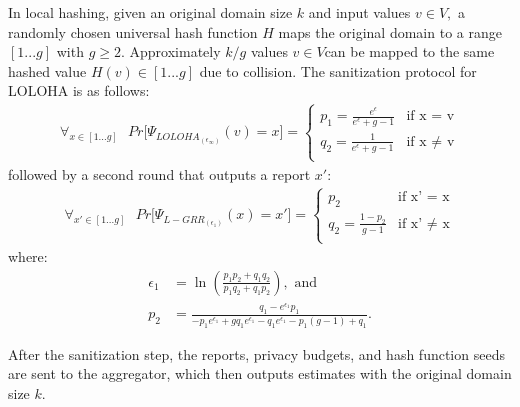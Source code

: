 In local hashing, given an original domain size $k$ and input values $v \in V,$ a randomly chosen universal hash function $H$ maps the original domain to a range $[1...g]$ with $g \geq 2$. Approximately $k/g$ values $v \in V $can be mapped to the same hashed value $H(v) \in [1...g]$ due to collision. The sanitization protocol for LOLOHA is as follows:
% 
\begin{align*}
\forall_{x \in [1...g]}\text{ }Pr\bigr[\Psi_{LOLOHA_{(\epsilon_\infty)}}(v) = x\bigr] =
\begin{cases}
      p_1 = \frac{e^\epsilon}{e^\epsilon + g - 1}  & \text{if x = v} \\
      q_2 = \frac{1}{e^\epsilon + g - 1} & \text{if x $\neq$ v} \\
\end{cases} 
\end{align*}
followed by a second round that outputs a report $x'$:
\begin{align*}
\forall_{x' \in [1...g]}\text{ }Pr\bigr[\Psi_{L-GRR_{(\epsilon_1)}}(x) = x'\bigr] =
\begin{cases}
      p_2 & \text{if x' = x} \\
      q_2 = \frac{1 - p_2}{g - 1} & \text{if x' $\neq$ x} \\
\end{cases} 
\end{align*}
where:
\begin{align*}
\epsilon_1 &= \ln\left(\frac{p_1p_2 + q_1q_2}{p_1q_2 + q_1p_2}\right), \text{ and} \\
p_2 &= \frac{q_1 - e^{\epsilon_1}p_1}{
  -p_1e^{\epsilon_1} + gq_1e^{\epsilon_1} - q_1e^{\epsilon_1} - p_1(g - 1) + q_1}.
\end{align*}

After the sanitization step, the reports, privacy budgets, and hash function seeds are sent to the aggregator, which then outputs estimates with the original domain size $k$.